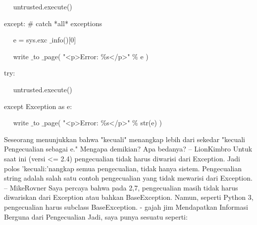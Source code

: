 {\fontsize{10pt}{10pt}\selectfont ~~ untrusted.execute()} \par
\noindent 
\vspace{10pt}
\noindent 

{\fontsize{10pt}{10pt}\selectfont  except:  $  \#  $ catch *all* exceptions} \par
\noindent 
\vspace{10pt}
\noindent 

{\fontsize{10pt}{10pt}\selectfont ~~ e = sys.exc $  \_  $info()[0]} \par
\noindent 
\vspace{10pt}
\noindent 

{\fontsize{10pt}{10pt}\selectfont ~~ write $  \_  $to $  \_  $page( "<p>Error:  $  \%  $s</p>"  $  \%  $ e )} \par
\vspace{16pt}
\noindent 

{\fontsize{10pt}{10pt}\selectfont  try:} \par
\noindent 
\vspace{10pt}
\noindent 
 
{\fontsize{10pt}{10pt}\selectfont ~~ untrusted.execute()} \par
\noindent 
\vspace{10pt}
\noindent 
 
{\fontsize{10pt}{10pt}\selectfont  except Exception as e:} \par
\noindent 
\vspace{10pt}
\noindent 
 
{\fontsize{10pt}{10pt}\selectfont ~~ write $  \_  $to $  \_  $page( "<p>Error:  $  \%  $s</p>"  $  \%  $ str(e) )} \par
\vspace{16pt}
\noindent 
 \hspace*{0.64in} Seseorang menunjukkan bahwa "kecuali" menangkap lebih dari sekedar "kecuali Pengecualian sebagai e." Mengapa demikian? Apa bedanya? – LionKimbro Untuk saat ini (versi <= 2.4) pengecualian tidak harus diwarisi dari Exception. Jadi polos 'kecuali:'nangkap semua pengecualian, tidak hanya sistem. Pengecualian string adalah salah satu contoh pengecualian yang tidak mewarisi dari Exception. – MikeRovner Saya percaya bahwa pada 2,7, pengecualian masih tidak harus diwariskan dari Exception atau bahkan BaseException. Namun, seperti Python 3, pengecualian harus subclass BaseException. - gajah jim Mendapatkan Informasi Berguna dari Pengecualian Jadi, saya punya sesuatu seperti: \par
\noindent 
\vspace{12pt}
\noindent 

